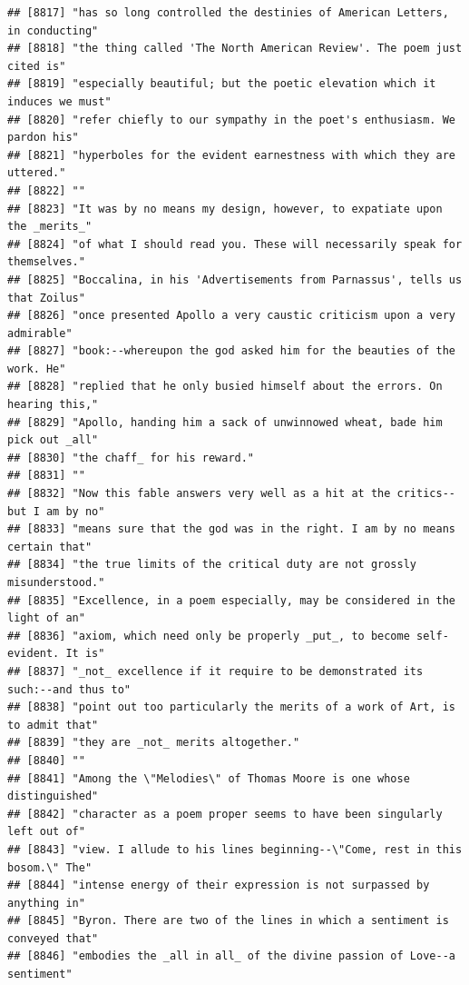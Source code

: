 \documentclass{article}\usepackage[]{graphicx}\usepackage[]{color}
\makeatletter
\newenvironment{kframe}{%
 \def\at@end@of@kframe{}%
 \ifinner\ifhmode%
  \def\at@end@of@kframe{\end{minipage}}%
  \begin{minipage}{\columnwidth}%
 \fi\fi%
 \def\FrameCommand##1{\hskip\@totalleftmargin \hskip-\fboxsep
 \colorbox{shadecolor}{##1}\hskip-\fboxsep
     \hskip-\linewidth \hskip-\@totalleftmargin \hskip\columnwidth}%
 \MakeFramed {\advance\hsize-\width
   \@totalleftmargin\z@ \linewidth\hsize
   \@setminipage}}%
 {\par\unskip\endMakeFramed%
 \at@end@of@kframe}
\newenvironment{knitrout}{}{} %
\makeatother
\begin{document}
\begin{knitrout}
\begin{kframe}
\begin{verbatim}
## [8817] "has so long controlled the destinies of American Letters, in conducting"     
## [8818] "the thing called 'The North American Review'. The poem just cited is"        
## [8819] "especially beautiful; but the poetic elevation which it induces we must"     
## [8820] "refer chiefly to our sympathy in the poet's enthusiasm. We pardon his"       
## [8821] "hyperboles for the evident earnestness with which they are uttered."         
## [8822] ""                                                                            
## [8823] "It was by no means my design, however, to expatiate upon the _merits_"       
## [8824] "of what I should read you. These will necessarily speak for themselves."     
## [8825] "Boccalina, in his 'Advertisements from Parnassus', tells us that Zoilus"     
## [8826] "once presented Apollo a very caustic criticism upon a very admirable"        
## [8827] "book:--whereupon the god asked him for the beauties of the work. He"         
## [8828] "replied that he only busied himself about the errors. On hearing this,"      
## [8829] "Apollo, handing him a sack of unwinnowed wheat, bade him pick out _all"      
## [8830] "the chaff_ for his reward."                                                  
## [8831] ""                                                                            
## [8832] "Now this fable answers very well as a hit at the critics--but I am by no"    
## [8833] "means sure that the god was in the right. I am by no means certain that"     
## [8834] "the true limits of the critical duty are not grossly misunderstood."         
## [8835] "Excellence, in a poem especially, may be considered in the light of an"      
## [8836] "axiom, which need only be properly _put_, to become self-evident. It is"     
## [8837] "_not_ excellence if it require to be demonstrated its such:--and thus to"    
## [8838] "point out too particularly the merits of a work of Art, is to admit that"    
## [8839] "they are _not_ merits altogether."                                           
## [8840] ""                                                                            
## [8841] "Among the \"Melodies\" of Thomas Moore is one whose distinguished"           
## [8842] "character as a poem proper seems to have been singularly left out of"        
## [8843] "view. I allude to his lines beginning--\"Come, rest in this bosom.\" The"    
## [8844] "intense energy of their expression is not surpassed by anything in"          
## [8845] "Byron. There are two of the lines in which a sentiment is conveyed that"     
## [8846] "embodies the _all in all_ of the divine passion of Love--a sentiment"        

\end{verbatim}
\end{kframe}
\end{knitrout}
\end{document}
